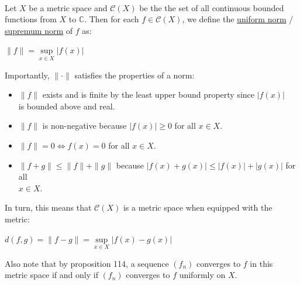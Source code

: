 \documentclass{book}
\newcommand{\udefine}[1]{{%
   \setulcolor{Red}%
   \setul{0.14em}{0.07em}%
   \ul{#1}%
}}
\newcommand{\mySepTwo}[1][.]{%
   {\noindent\color{#1}{\rule{6.5in}{0.5mm}}}\\%
}
\newcommand{\retTwo}{\hfill\bigbreak}
\begin{document}
\mySepTwo

Let $X$ be a metric space and $\mathscr{C}(X)$ be the the set of all continuous bounded\\ functions from $X$ to $\mathbb{C}$. Then for each $f \in \mathscr{C}(X)$, we define the \udefine{uniform norm} /\\ \udefine{supremum norm} of $f$ as:

{\centering $\|f\| = \sup\limits_{x\in X}|f(x)|$ \par}

\newpage

Importantly, $\|\cdot \|$ satisfies the properties of a norm:\\ [-21pt]
\begin{itemize}
   \item $\|f\|$ exists and is finite by the least upper bound property since $|f(x)|$\\ is bounded above and real.\\[-20pt]
   \item $\|f\|$ is non-negative because $|f(x)| \geq 0$ for all $x \in X$.\\[-20pt]
   \item $\|f\| = 0 \Longleftrightarrow f(x) = 0$ for all $x \in X$.\\[-20pt]
   \item $\|f + g\| \leq \|f\| + \|g\|$ because $|f(x) + g(x)| \leq |f(x)| + |g(x)|$ for all\\ $x \in X$.\retTwo
\end{itemize}

In turn, this means that  $\mathscr{C}(X)$ is a metric space when equipped with the metric:

{\centering$ d(f, g) = \|f - g\| = \sup\limits_{x\in X}|f(x) - g(x)|$ \retTwo\par}

Also note that by proposition 114, a sequence $(f_n)$ converges to $f$ in this\\ metric space if and only if $(f_n)$ converges to $f$ uniformly on $X$.\retTwo
\end{document}
